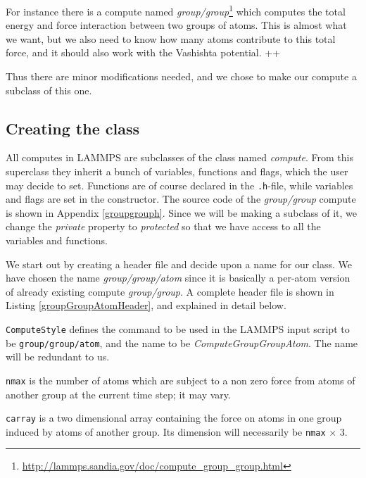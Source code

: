 \documentclass[twoside,english]{uiofysmaster}
\begin{document}
For instance there is a compute named \textit{group/group}\footnote{\href{http://lammps.sandia.gov/doc/compute_group_group.html}{http://lammps.sandia.gov/doc/compute\_group\_group.html}} which computes the total energy and force interaction between two groups of atoms. This is almost what we want, but we also need to know how many atoms contribute to this total force, and it should also work with the Vashishta potential. {\color{red} ++}

Thus there are minor modifications needed, and we chose to make our compute a subclass of this one.


\subsection{Creating the class}
All computes in LAMMPS are subclasses of the class named  \textit{compute}. From this superclass they inherit a bunch of variables, functions and flags, which the user may decide to set. Functions are of course declared in the \texttt{.h}-file, while variables and flags are set in the constructor. The source code of the \textit{group/group} compute is shown in Appendix \ref{groupgrouph}. Since we will be making a subclass of it, we change the \textit{private} property to \textit{protected} so that we have access to all the variables and functions.

We start out by creating a header file and decide upon a name for our class. We have chosen the name \textit{group/group/atom} since it is basically a per-atom version of already existing compute \textit{group/group}. A complete header file is shown in Listing \ref{groupGroupAtomHeader}, and explained in detail below.



\texttt{ComputeStyle} defines the command to be used in the LAMMPS input script to be \texttt{group/group/atom}, and the name to be \textit{ComputeGroupGroupAtom}. The name will be redundant to us. 

\texttt{nmax} is the number of atoms which are subject to a non zero force from atoms of another group at the current time step; it may vary.

\texttt{carray} is a two dimensional array containing the force on atoms in one group induced by atoms of another group. Its dimension will necessarily be \texttt{nmax} $\times$ 3.
\end{document}
